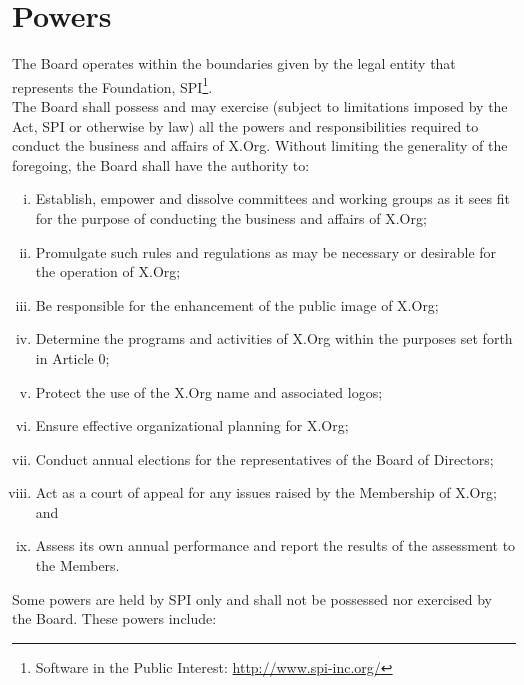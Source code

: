 \documentclass[10pt, english]{bylaws}
\begin{document}

\section{Powers}
The Board operates within the boundaries given by the legal entity that
represents the Foundation, SPI\footnote{Software
in the Public Interest: \url{http://www.spi-inc.org/}}.\\

The Board shall possess and may exercise (subject to limitations imposed by the
Act, SPI or otherwise by law) all the powers and responsibilities required to
conduct the business and affairs of X.Org. Without limiting the generality of
the foregoing, the Board shall have the authority to:

\begin{enumerate}[(i)\hspace{.2cm}]
	\item Establish, empower and dissolve committees and working groups as
	it sees fit for the purpose of conducting the business and affairs of
	X.Org;

	\item Promulgate such rules and regulations as may be necessary or
	desirable for the operation of X.Org;

	\item Be responsible for the enhancement of the public image of X.Org;

	\item Determine the programs and activities of X.Org within the purposes
	set forth in Article 0;

	\item Protect the use of the X.Org name and associated logos;

	\item Ensure effective organizational planning for X.Org;

	\item Conduct annual elections for the representatives of the Board of
	Directors;

	\item Act as a court of appeal for any issues raised by the Membership
	of X.Org; and

	\item Assess its own annual performance and report the results of the
	assessment to the Members.
\end{enumerate}

Some powers are held by SPI only and shall not be possessed nor exercised by
the Board. These powers include:
\end{document}
